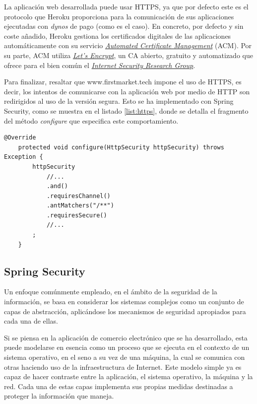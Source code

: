 \documentclass[a4paper]{article}
\begin{document}
	La aplicación web desarrollada puede usar HTTPS, ya que por defecto este es el protocolo que Heroku proporciona para la comunicación de sus aplicaciones ejecutadas con \emph{dynos} de pago (como es el caso). En concreto, por defecto y sin coste añadido, Heroku gestiona los certificados digitales de las aplicaciones automáticamente con su servicio \href{https://devcenter.heroku.com/articles/automated-certificate-management}{\emph{Automated Certificate Management}} (ACM). Por su parte, ACM utiliza \href{https://letsencrypt.org/}{\emph{Let’s Encrypt}}, un CA abierto, gratuito y automatizado que ofrece para el bien común el \href{https://www.abetterinternet.org/}{\emph{Internet Security Research Group}}.
	
	Para finalizar, resaltar que www.firstmarket.tech impone el uso de HTTPS, es decir, los intentos de comunicarse con la aplicación web por medio de HTTP son redirigidos al uso de la versión segura. Esto se ha implementado con Spring Security, como se muestra en el listado \ref{list:https}, donde se detalla el fragmento del método \emph{configure} que especifica este comportamiento.
	\\
	
	\begin{lstlisting}[caption=Configuración de Spring Security para imponer el uso de HTTPS,label=list:https]
	@Override
	protected void configure(HttpSecurity httpSecurity) throws Exception {
		httpSecurity
			//...
			.and()
			.requiresChannel()
			.antMatchers("/**")
			.requiresSecure()
			//...
		;
	}
	\end{lstlisting}
	
	\subsection{Spring Security} \label{sec:springsec}
	Un enfoque comúnmente empleado, en el ámbito de la seguridad de la información, se basa en considerar los sistemas complejos como un conjunto de capas de abstracción, aplicándose los mecanismos de seguridad apropiados para cada una de ellas.
	
	Si se piensa en la aplicación de comercio electrónico que se ha desarrollado, esta puede modelarse en esencia como un proceso que se ejecuta en el contexto de un sistema operativo, en el seno a su vez de una máquina, la cual se comunica con otras haciendo uso de la infraestructura de Internet. Este modelo simple ya es capaz de hacer contraste entre la aplicación, el sistema operativo, la máquina y la red. Cada una de estas capas implementa sus propias medidas destinadas a proteger la información que maneja.
	
\end{document}
